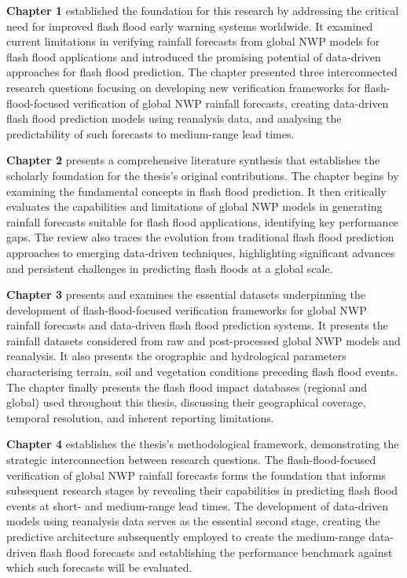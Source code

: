 \textbf{Chapter 1}  established the foundation for this research by addressing the critical need for improved flash flood early warning systems worldwide. It examined current limitations in verifying rainfall forecasts from global NWP models for flash flood applications and introduced the promising potential of data-driven approaches for flash flood prediction. The chapter presented three interconnected research questions focusing on developing new verification frameworks for flash-flood-focused verification of global NWP rainfall forecasts, creating data-driven flash flood prediction models using reanalysis data, and analysing the predictability of such forecasts to medium-range lead times.

\textbf{Chapter 2}  presents a comprehensive literature synthesis that establishes the scholarly foundation for the thesis's original contributions. The chapter begins by examining the fundamental concepts in flash flood prediction. It then critically evaluates the capabilities and limitations of global NWP models in generating rainfall forecasts suitable for flash flood applications, identifying key performance gaps. The review 
also traces the evolution from traditional flash flood prediction approaches to emerging data-driven techniques, highlighting significant advances and persistent challenges in predicting flash floods at a global scale.

\textbf{Chapter 3}  presents and examines the essential datasets underpinning the development of flash-flood-focused verification frameworks for global NWP rainfall forecasts and data-driven flash flood prediction systems. It presents the rainfall datasets considered from raw and post-processed global NWP models and reanalysis. It also presents the orographic and hydrological parameters characterising terrain, soil and vegetation conditions preceding flash flood events. The chapter finally presents the flash flood impact databases (regional and global) used throughout this thesis, discussing their geographical coverage, temporal resolution, and inherent reporting limitations. 

\textbf{Chapter 4}  establishes the thesis's methodological framework, demonstrating the strategic interconnection between research questions. The flash-flood-focused verification of global NWP rainfall forecasts forms the foundation that informs subsequent research stages by revealing their capabilities in predicting flash flood events at short- and medium-range lead times. The development of data-driven models using reanalysis data serves as the essential second stage, creating the predictive architecture subsequently employed to create the medium-range data-driven flash flood forecasts and establishing the performance benchmark against which such forecasts will be evaluated. 

